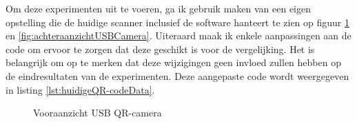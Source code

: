Om deze experimenten uit te voeren, ga ik gebruik maken van een eigen opstelling die de huidige scanner inclusief de software hanteert te zien op figuur \ref{fig:vooraanzichtUSBCamera} en \ref{fig:achteraanzichtUSBCamera}. Uiteraard maak ik enkele aanpassingen aan de code om ervoor te zorgen dat deze geschikt is voor de vergelijking.  Het is belangrijk om op te merken dat deze wijzigingen geen invloed zullen hebben op de eindresultaten van de experimenten. Deze aangepaste code wordt weergegeven in listing \ref{lst:huidigeQR-codeData}.

\begin{figure}[h]
    \centering
    \begin{minipage}{0.45\textwidth}
        \centering
        \caption{Vooraanzicht USB QR-camera}
        \label{fig:vooraanzichtUSBCamera}
    \end{minipage}
    \hfill
    \begin{minipage}{0.45\textwidth}

\end{minipage}
\end{figure}
